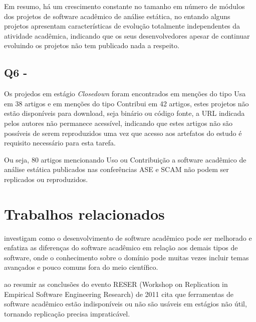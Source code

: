 Em resumo, há um crescimento constante no tamanho em número de módulos dos
projetos de software acadêmico de análise estática, no entando alguns projetos
apresentam características de evolução totalmente independentes da atividade
acadêmica, indicando que os seus desenvolvedores apesar de continuar evoluindo
os projetos não tem publicado nada a respeito.

\subsection{Q6 - \QuestaoSeis}


Os projedos em estágio {\it Closedown} foram encontrados em menções do tipo Usa
em 38 artigos e em menções do tipo Contribui em 42 artigos, estes projetos não
estão disponíveis para download, seja binário ou código fonte, a URL indicada
pelos autores não permanece acessível, indicando que estes artigos não são
possíveis de serem reproduzidos uma vez que acesso aos artefatos do estudo é
requisito necessário para esta tarefa.

Ou seja, 80 artigos mencionando Uso ou Contribuição a software acadêmico de
análise estática publicados nas conferências ASE e SCAM não podem ser
replicados ou reproduzidos.


\section{Trabalhos relacionados}

investigam como o desenvolvimento de software acadêmico pode ser melhorado e
enfatiza as diferenças do software acadêmico em relação aos demais tipos de
software, onde o conhecimento sobre o domínio pode muitas vezes incluir temas
avançados e pouco comuns fora do meio científico.

ao resumir as conclusões do evento RESER (Workshop on Replication in Empirical
Software Engineering Research) de 2011 cita que ferramentas de software
acadêmico estão indisponíveis ou não são usáveis em estágios não útil, tornando
replicação precisa impraticável.

